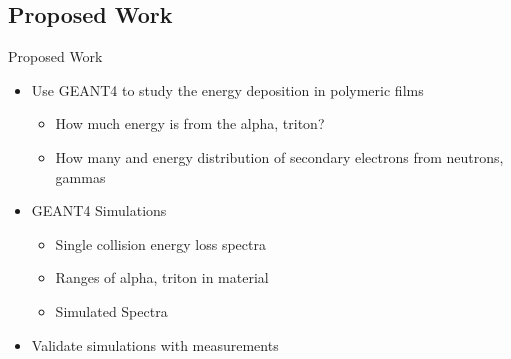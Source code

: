 \subsection{Proposed Work}
\begin{frame}{Proposed Work}
  \large
  \vspace{1cm}
  \normalsize
  \begin{itemize}
    \item Use GEANT4 to study the energy deposition in polymeric films
    \small
    \begin{itemize}
      \item How much energy is from the alpha, triton?
      \item How many and energy distribution of secondary electrons from neutrons, gammas
    \end{itemize}
    \item GEANT4 Simulations
    \begin{itemize}
      \item Single collision energy loss spectra
      \item Ranges of alpha, triton in material
      \item Simulated Spectra
    \end{itemize}
    \item Validate simulations with measurements
  \end{itemize}
\end{frame}
